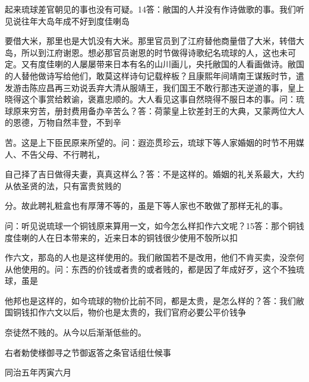 起来琉球差官朝见的事也没有可疑。14答：敝国的人并没有作诗做歌的事。我们听见说往年大岛年成不好到度佳喇岛

要借大米，那里也是大饥没有大米。那里官员到了江府替他商量借了大米，转借大岛，所以到江府谢恩。想必那官员谢恩的时节做得诗歌纪名琉球的人，这也未可定。又有度佳喇的人屡屡带来日本有名的山川画儿，央托敝国的人看画做诗。敝国的人替他做诗写给他们，敢莫这样诗句记载梓板？且康熙年间靖南王谋叛时节，遣发游击陈应昌再三劝说丢弃大清从服靖王，我们国王不敢行那违天逆道的事，皇上晓得这个事赏给敕谕，褒嘉忠顺的。大人看见这事自然晓得不服日本的事。问：琉球原来穷苦，册封费用备办辛苦么？答：荷蒙皇上钦差封王的大典，又蒙两位大人的恩德，万物自然丰登，不到辛

苦。这是上下臣民原来所望的。问：遐迩贯珍云，琉球下等人家婚姻的时节不用媒人、不告父母、不行聘礼，

自己择了吉日做得夫妻，真真这样么？答：不是这样的。婚姻的礼关系最大，大约从依圣贤的法，只有富贵贫贱的

分。故此聘礼粧盒也有厚薄不等的，虽是下等人家也不敢做了那样无礼的事。

\vfill
\begin{BookNotes}
\end{BookNotes}

\noindent 问：听见说琉球一个铜钱原来算用一文，如今怎么样扣作六文呢？15答：那个铜钱度佳喇的人在日本带来的，近来日本的铜钱很少使用不彀所以扣

作六文，那岛的人也是这样使用的。我们敝国若不是改用，他们不肯买卖，没奈何从他使用的。问：东西的价钱或者贵的或者贱的，都是因了年成好歹，这个不独琉球，虽是

他邦也是这样的，如今琉球的物价比前不同，都是太贵，是怎么样的？答：我们敝国铜钱扣作六文以后，物价也是太贵的，我们官府必要公平价钱争

奈徒然不贱的。从今以后渐渐低些的。

右者勅使様御寻之节御返答之条官话组仕候事

同治五年丙寅六月

